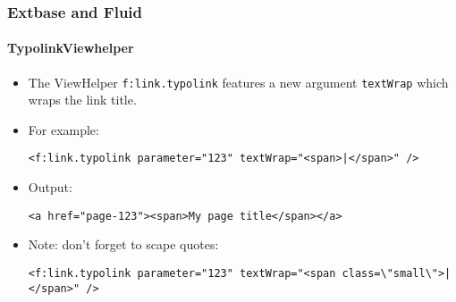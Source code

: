 %

\begin{frame}[fragile]
	\frametitle{Extbase and Fluid}
	\framesubtitle{TypolinkViewhelper}


	\begin{itemize}
		\item The ViewHelper \texttt{f:link.typolink} features a new argument
			\texttt{textWrap} which wraps the link title.

		\item For example:
\begin{lstlisting}
<f:link.typolink parameter="123" textWrap="<span>|</span>" />
\end{lstlisting}

		\item Output:
\begin{lstlisting}
<a href="page-123"><span>My page title</span></a>
\end{lstlisting}

		\item Note: don't forget to scape quotes:
\begin{lstlisting}
<f:link.typolink parameter="123" textWrap="<span class=\"small\">|</span>" />
\end{lstlisting}

	\end{itemize}

\end{frame}

